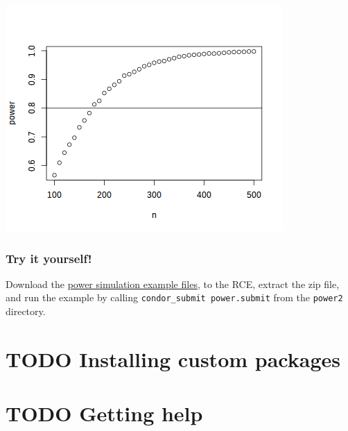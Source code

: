 \documentclass[11pt]{article}
\begin{document}
\includegraphics[width=.9\linewidth]{images/powerDist.png}

\subsubsection{Try it yourself!}
\label{sec-7-4-4}
Download the \href{examples/power2.zip}{power simulation example files}, to the RCE, extract the zip file, and run the example by calling \texttt{condor\_submit power.submit} from the \texttt{power2} directory.

\section{{\bfseries\sffamily TODO} Installing custom packages}
\label{sec-8}

\section{{\bfseries\sffamily TODO} Getting help}
\label{sec-9}
\end{document}
